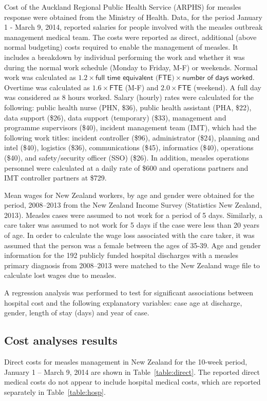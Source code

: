 \documentclass{article}
\begin{document}
Cost of the Auckland Regional Public Health Service (ARPHS) for measles response were obtained from the Ministry of Health. Data, for the period January 1 - March 9, 2014, reported salaries for people involved with the measles outbreak management medical team. The costs were reported as direct, additional (above normal budgeting) costs required to enable the management of measles. It includes a breakdown by individual performing the work and whether it was during the normal work schedule (Monday to Friday, M-F) or weekends. Normal work was calculated as $1.2 \times \textsf{full time equivalent (FTE)} \times \textsf{number of days worked}$. Overtime was calculated as $1.6\times\textsf{FTE}$ (M-F) and $2.0 \times \textsf{FTE}$ (weekend). A full day was considered as 8 hours worked. Salary (hourly) rates were calculated for the following: public health nurse (PHN, \$36), public health assistant (PHA, \$22), data support (\$26), data support (temporary) (\$33), management and programme supervisors (\$40), incident management team (IMT), which had the following work titles: incident controller (\$96), administrator (\$24), planning and intel (\$40), logistics (\$36), communications (\$45), informatics (\$40), operations (\$40), and safety/security officer (SSO) (\$26). In addition, measles operations personnel were calculated at a daily rate of \$600 and operations partners and IMT controller partners at \$729.

Mean wages for New Zealand workers, by age and gender were obtained for the period, 2008--2013 from the New Zealand Income Survey (Statistics New Zealand, 2013). Measles cases were assumed to not work for a period of 5 days. Similarly, a care taker was assumed to not work for 5 days if the case were less than 20 years of age. In order to calculate the wage loss associated with the care taker, it was assumed that the person was a female between the ages of 35-39. Age and gender information for the 192 publicly funded hospital discharges with a measles primary diagnosis from 2008--2013 were matched to the New Zealand wage file to calculate lost wages due to measles.

A regression analysis was performed to test for significant associations between hospital cost and the following explanatory variables: case age at discharge, gender, length of stay (days) and year of case.

\subsection{Cost analyses results}
\label{sub:cost_benefit}
Direct costs for measles management in New Zealand for the 10-week period, January 1 -- March 9, 2014 are shown in  Table~\ref{table:direct}. The reported direct medical costs do not appear to include hospital medical costs, which are reported separately in Table~\ref{table:hosp}. 
\end{document}

